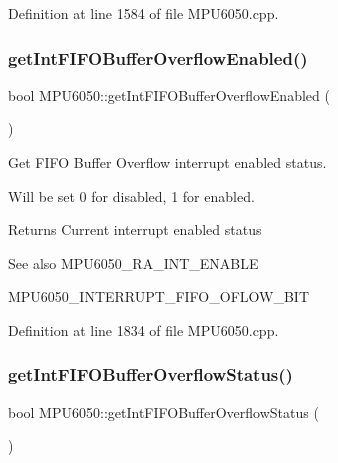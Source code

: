 Definition at line 1584 of file M\+P\+U6050.\+cpp.

\mbox{\label{classMPU6050_a55f99c88cc84901f245924ed5e3fe47e}} 
\subsubsection{\texorpdfstring{getIntFIFOBufferOverflowEnabled()}{getIntFIFOBufferOverflowEnabled()}}
{\footnotesize\ttfamily bool M\+P\+U6050\+::get\+Int\+F\+I\+F\+O\+Buffer\+Overflow\+Enabled (\begin{DoxyParamCaption}{ }\end{DoxyParamCaption})}



Get F\+I\+FO Buffer Overflow interrupt enabled status. 

Will be set 0 for disabled, 1 for enabled. \begin{DoxyReturn}{Returns}
Current interrupt enabled status 
\end{DoxyReturn}
\begin{DoxySeeAlso}{See also}
M\+P\+U6050\+\_\+\+R\+A\+\_\+\+I\+N\+T\+\_\+\+E\+N\+A\+B\+LE 

M\+P\+U6050\+\_\+\+I\+N\+T\+E\+R\+R\+U\+P\+T\+\_\+\+F\+I\+F\+O\+\_\+\+O\+F\+L\+O\+W\+\_\+\+B\+IT 
\end{DoxySeeAlso}


Definition at line 1834 of file M\+P\+U6050.\+cpp.

\mbox{\label{classMPU6050_aa31427588f059c69d93ddb00ba257b12}} 
\subsubsection{\texorpdfstring{getIntFIFOBufferOverflowStatus()}{getIntFIFOBufferOverflowStatus()}}
{\footnotesize\ttfamily bool M\+P\+U6050\+::get\+Int\+F\+I\+F\+O\+Buffer\+Overflow\+Status (\begin{DoxyParamCaption}{ }\end{DoxyParamCaption})}



